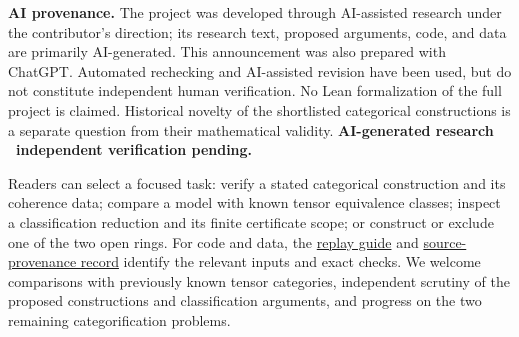 \documentclass[11pt,a4paper]{article}
\newcommand{\snap}{https://github.com/sebastienpalcoux/grothendieck-ring-classification/blob/e34396cd95aff1090c10974dd934fe6054ca45eb}
\newcommand{\prooflink}[2]{\href{\snap/#1}{#2}}
\newcommand{\caution}{\textbf{AI-generated research \textperiodcentered\ independent verification pending.}}
\begin{document}
\textbf{AI provenance.} The project was developed through AI-assisted
research under the contributor's direction; its research text, proposed
arguments, code, and data are primarily AI-generated. This announcement
was also prepared with ChatGPT. Automated rechecking and AI-assisted
revision have been used, but do not constitute independent human
verification. No Lean formalization of the full project is claimed.
Historical novelty of the shortlisted categorical constructions is a
separate question from their mathematical validity. \caution

Readers can select a focused task: verify a stated categorical construction
and its coherence data; compare a model with known tensor equivalence
classes; inspect a classification reduction and its finite certificate
scope; or construct or exclude one of the two open rings. For code and
data, the \prooflink{docs/VERIFY.md}{replay guide} and
\prooflink{docs/PROVENANCE.md}{source-provenance record} identify the
relevant inputs and exact checks. We welcome comparisons with previously
known tensor categories, independent scrutiny of the proposed
constructions and classification arguments, and progress on the two
remaining categorification problems.
\end{document}
